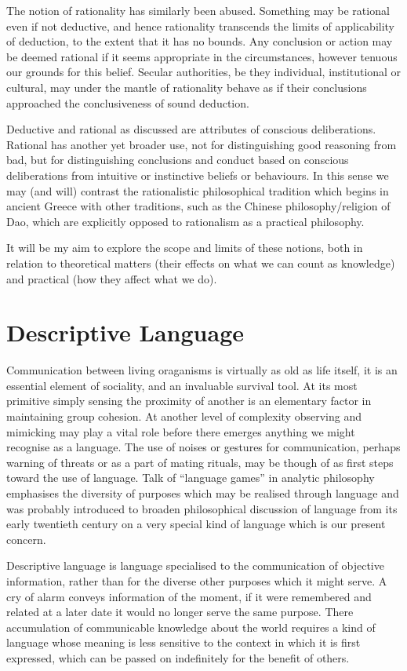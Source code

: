 The notion of rationality has similarly been abused.
Something may be rational even if not deductive, and hence rationality transcends the limits of applicability of deduction, to the extent that it has no bounds.
Any conclusion or action may be deemed rational if it seems appropriate in the circumstances, however tenuous our grounds for this belief.
Secular authorities, be they individual, institutional or cultural, may under the mantle of rationality behave as if their conclusions approached the conclusiveness of sound deduction.

Deductive and rational as discussed are attributes of conscious deliberations.
Rational has another yet broader use, not for distinguishing good reasoning from bad, but for distinguishing conclusions and conduct based on conscious deliberations from intuitive or instinctive beliefs or behaviours.
In this sense we may (and will) contrast the rationalistic philosophical tradition which begins in ancient Greece with other traditions, such as the Chinese philosophy/religion of Dao, which are explicitly opposed to rationalism as a practical philosophy.

It will be my aim to explore the scope and limits of these notions, both in relation to theoretical matters (their effects on what we can count as knowledge) and practical (how they affect what we do).

\section{Descriptive Language}

Communication between living oraganisms is virtually as old as life itself, it is an essential element of sociality, and an invaluable survival tool.
At its most primitive simply sensing the proximity of another is an elementary factor in maintaining group cohesion.
At another level of complexity observing and mimicking may play a vital role before there emerges anything we might recognise as a language.
The use of noises or gestures for communication, perhaps warning of threats or as a part of mating rituals, may be though of as first steps toward the use of language.
Talk of ``language games'' in analytic philosophy emphasises the diversity of purposes which may be realised through language and was probably introduced to broaden philosophical discussion of language from its early twentieth century on a very special kind of language which is our present concern.

Descriptive language is language specialised to the communication of objective information, rather than for the diverse other purposes which it might serve.
A cry of alarm conveys information of the moment, if it were remembered and related at a later date it would no longer serve the same purpose.
There accumulation of communicable knowledge about the world requires a kind of language whose meaning is less sensitive to the context in which it is first expressed, which can be passed on indefinitely for the benefit of others.

